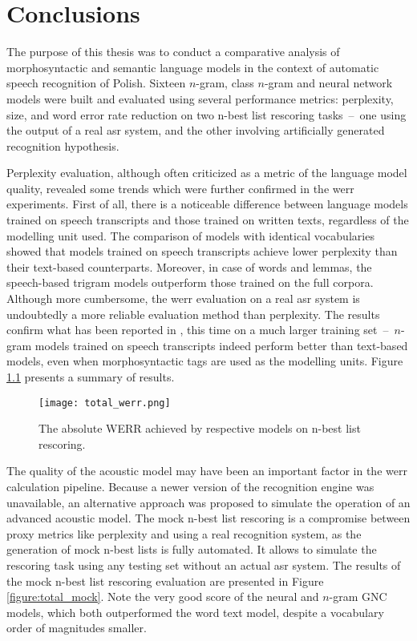 \chapter{Conclusions}
\label{chapter:conclusion}
The purpose of this thesis was to conduct a comparative analysis of morphosyntactic and semantic language models in the context of automatic speech recognition of Polish. Sixteen \mbox{$n$-gram,} class \mbox{$n$-gram} and neural network models were built and evaluated using several performance metrics: perplexity, size, and word error rate reduction on two n-best list rescoring tasks~--~one using the output of a real \gls{asr} system, and the other involving artificially generated recognition hypothesis.

Perplexity evaluation, although often criticized as a metric of the language model quality, revealed some trends which were further confirmed in the \gls{werr} experiments. First of all, there is a noticeable difference between language models trained on speech transcripts and those trained on written texts, regardless of the modelling unit used. The comparison of models with identical vocabularies showed that models trained on speech transcripts achieve lower perplexity than their text-based counterparts. Moreover, in case of words and lemmas, the speech-based trigram models outperform those trained on the full corpora.
Although more cumbersome, the \gls{werr} evaluation on a real \gls{asr} system is undoubtedly a more reliable evaluation method than perplexity. The results confirm what has been reported in \cite{dziadzio2015comparison}, this time on a much larger training set~--~\mbox{$n$-gram} models trained on speech transcripts indeed perform better than text-based models, even when morphosyntactic tags are used as the modelling units. Figure \ref{figure:total} presents a summary of results.

\begin{figure}[!htbp]
	  \centering
	  \texttt{[image: total\_werr.png]}
	  \caption[The absolute WERR achieved by respective models on n-best list rescoring]{The absolute WERR achieved by respective models on n-best list rescoring.}
	      \label{figure:total}
\end{figure}

The quality of the acoustic model may have been an important factor in the \gls{werr} calculation pipeline. Because a newer version of the recognition engine was unavailable, an alternative approach was proposed to simulate the operation of an advanced acoustic model. The mock n-best list rescoring is a compromise between proxy metrics like perplexity and using a real recognition system, as the generation of mock n-best lists is fully automated. It allows to simulate the rescoring task using any testing set without an actual \gls{asr} system. The results of the mock n-best list rescoring evaluation are presented in Figure \ref{figure:total_mock}. Note the very good score of the neural and \mbox{$n$-gram} GNC models, which both outperformed the word text model, despite a vocabulary order of magnitudes smaller.

